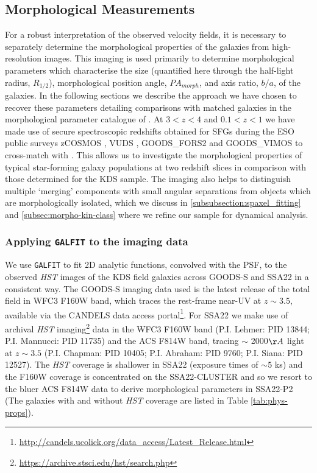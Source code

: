 \documentclass[fleqn,usenatbib]{mn2e}
\begin{document}
\subsection{Morphological Measurements}\label{subsec:morphological_measurements}
For a robust interpretation of the observed velocity fields, it is necessary to separately determine the morphological properties of the galaxies from high-resolution images.
This imaging is used primarily to determine morphological parameters which characterise the size (quantified here through the half-light radius, $R_{1/2}$), morphological position angle, $PA_{morph}$, and axis ratio, $b/a$, of the galaxies. 
In the following sections we describe the approach we have chosen to recover these parameters detailing comparisons with matched galaxies in the morphological parameter catalogue of \cite{VanderWel2012}.
At $3 < z < 4$ and $0.1 < z < 1$ we have made use of secure spectroscopic redshifts obtained for SFGs during the ESO public surveys zCOSMOS \citep{Lilly2007}, VUDS \citep{Tasca2016}, GOODS\_FORS2 \citep{Vanzella2005,Vanzella2006,Vanzella2008} and GOODS\_VIMOS \citep{Balestra2010} to cross-match with \cite{VanderWel2012}.
This allows us to investigate the morphological properties of typical star-forming galaxy populations at two redshift slices in comparison with those determined for the KDS sample.
The imaging also helps to distinguish multiple `merging' components with small angular separations from objects which are morphologically isolated, which we discuss in \cref{subsubsection:spaxel_fitting} and \cref{subsec:morpho-kin-class} where we refine our sample for dynamical analysis.

\subsubsection{Applying {\tt GALFIT} to the imaging data}\label{subsubsec:galfitting}
We use {\tt GALFIT} \citep{Peng2010_galfit} to fit 2D analytic functions, convolved with the PSF, to the observed {\em HST} images of the KDS field galaxies across GOODS-S and SSA22 in a consistent way.
The GOODS-S imaging data used is the latest release of the total field in WFC3 F160W band, which traces the rest-frame near-UV at $z \sim 3.5$, available via the CANDELS \citep{Grogin2011,Koekemoer2011} data access portal\footnote{\url{http://candels.ucolick.org/data_access/Latest_Release.html}}.
For SSA22 we make use of archival {\em HST} imaging\footnote{\url{https://archive.stsci.edu/hst/search.php}} data in the WFC3 F160W band (P.I. Lehmer: PID 13844; P.I. Mannucci: PID 11735) and the ACS F814W band, tracing $\sim$ 2000$\AA$ light at $z\sim 3.5$ (P.I. Chapman: PID 10405; P.I. Abraham: PID 9760; P.I. Siana: PID 12527).
The {\em HST} coverage is shallower in SSA22 (exposure times of $\sim 5$ ks) and the F160W coverage is concentrated on the SSA22-CLUSTER and so we resort to the bluer ACS F814W data to derive morphological parameters in SSA22-P2 (The galaxies with and without {\em HST} coverage are listed in Table \ref{tab:phys-props}). \\
\end{document}
